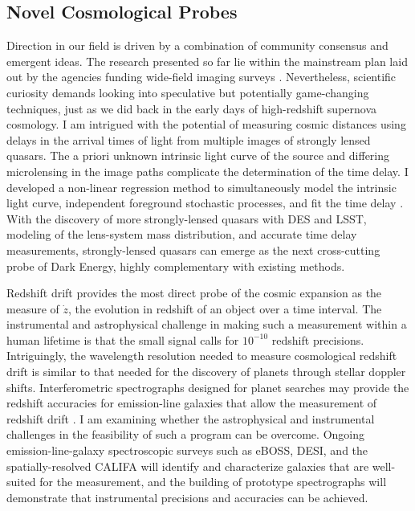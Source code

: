 \documentclass{article}
\begin{document}
\subsection{Novel Cosmological Probes}
Direction in our field is driven by a combination of community consensus and emergent ideas.
The research presented so far  lie  within the
mainstream plan laid out by the agencies funding wide-field imaging surveys
\cite{2013arXiv1309.5386D,2013arXiv1309.5382K}.
Nevertheless, scientific curiosity demands looking into speculative but potentially game-changing
techniques, just as we did back in the early days of high-redshift supernova cosmology.
I am intrigued with the potential of measuring cosmic distances using delays in the arrival times of light from multiple images
of strongly lensed quasars.  The a priori unknown intrinsic light curve of the source and differing microlensing
in the image paths complicate the determination of the time delay.  I developed a
non-linear regression method to simultaneously model the intrinsic light curve, independent foreground
stochastic processes, and fit the time delay \cite{2013PhRvD..87l3512H}.  With the discovery of more 
strongly-lensed quasars with DES and LSST, modeling of the lens-system mass distribution, and accurate
time delay measurements, strongly-lensed
quasars can emerge as the next cross-cutting probe of Dark Energy, highly complementary with existing methods.

Redshift drift provides the most direct  probe
of the cosmic expansion as the measure of $\dot{z}$, the evolution in redshift of an object over a time interval.
The instrumental
and astrophysical challenge
in making such a measurement within a human lifetime
is that the small signal calls for $10^{-10}$ redshift precisions.  Intriguingly, the wavelength resolution needed to measure
cosmological redshift drift is similar to that needed for the discovery of planets through stellar doppler shifts.
Interferometric spectrographs designed for planet searches may provide the redshift accuracies for emission-line galaxies
that allow the measurement of redshift drift
\cite{2014arXiv1402.6614K}.
I  am examining whether the astrophysical and instrumental challenges in the feasibility of such a program can be overcome.
Ongoing  emission-line-galaxy  spectroscopic surveys such
as eBOSS, DESI, and the spatially-resolved CALIFA will identify and characterize
galaxies that are well-suited for the measurement, and the building of prototype spectrographs will demonstrate that
instrumental precisions and accuracies can be achieved.
\end{document}
